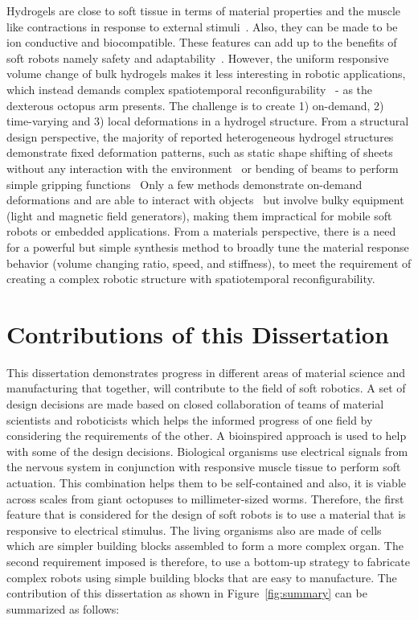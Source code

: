 Hydrogels are close to soft tissue in terms of material properties and the muscle like contractions in response to external stimuli~\cite{Liu2020}. Also, they can be made to be ion conductive and biocompatible. These features can add up to the benefits of soft robots namely safety and adaptability~\cite{Lee2020}. However, the uniform responsive volume change of bulk hydrogels makes it less interesting in robotic applications, which instead demands complex spatiotemporal reconfigurability~\cite{Erol2019} - as the dexterous octopus arm presents. The challenge is to create 1) on-demand, 2) time-varying and 3) local deformations in a hydrogel structure. From a structural design perspective, the majority of reported heterogeneous hydrogel structures demonstrate fixed deformation patterns, such as static shape shifting of sheets without any interaction with the environment~\cite{SydneyGladman2016, Ma2019, Jeon2017} or bending of beams to perform simple gripping functions~\cite{Wang2017, Ma2018, Duan2017} Only a few methods demonstrate on-demand deformations and are able to interact with objects~\cite{Mourran2017, Palagi2016, Kim2018} but involve bulky equipment (light and magnetic field generators), making them impractical for mobile soft robots or embedded applications.
From a materials perspective, there is a need for a powerful but simple synthesis method to broadly tune the material response behavior (volume changing ratio, speed, and stiffness), to meet the requirement of creating a complex robotic structure with spatiotemporal reconfigurability.

\section{Contributions of this Dissertation}
This dissertation demonstrates progress in different areas of material science and manufacturing  that together, will contribute to the field of soft robotics. A set of design decisions are made based on closed collaboration of teams of material scientists and roboticists which helps the informed progress of one field by considering the requirements of the other. A bioinspired approach is used to help with some of the design decisions. Biological organisms use electrical signals from the nervous system in conjunction with responsive muscle tissue to perform soft actuation. This combination helps them to be self-contained and also, it is viable across scales from giant octopuses to millimeter-sized worms. Therefore, the first feature that is considered for the design of soft robots is to use a material that is responsive to electrical stimulus. The living organisms also are made of cells which are simpler building blocks assembled to form a more complex organ. The second requirement imposed is therefore, to use a bottom-up strategy to fabricate complex robots using simple building blocks that are easy to manufacture. The contribution of this dissertation as shown in Figure~\ref{fig:summary} can be summarized as follows:


